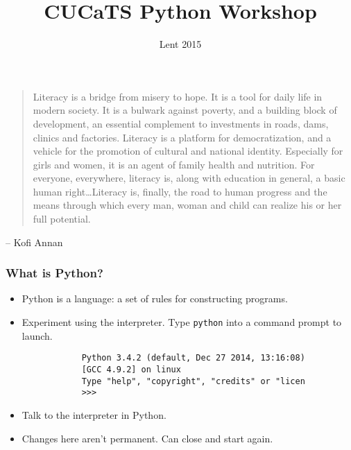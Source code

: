 \documentclass[notes]{beamer}
\title{CUCaTS Python Workshop}
\date{Lent 2015}
\begin{document}
	
	\begin{frame}[fragile]
		\maketitle
	\end{frame}
	
	\begin{frame}[fragile]
		\begin{quotation}
			Literacy is a bridge from misery to hope. It is a tool for daily life in modern society. It is a bulwark against poverty, and a building block of development, an essential complement to investments in roads, dams, clinics and factories. Literacy is a platform for democratization, and a vehicle for the promotion of cultural and national identity. Especially for girls and women, it is an agent of family health and nutrition. For everyone, everywhere, literacy is, along with education in general, a basic human right\dots Literacy is, finally, the road to human progress and the means through which every man, woman and child can realize his or her full potential.
		\end{quotation}
		\hfill  -- Kofi Annan
	\end{frame}
	
	\begin{frame}[fragile]
		\frametitle{What is Python?}
		\begin{itemize}
			\item Python is a language: a set of rules for constructing programs.
			\pause
			\item Experiment using the interpreter. Type \lstinline|python| into a command prompt to launch.
			\begin{lstlisting}
			Python 3.4.2 (default, Dec 27 2014, 13:16:08)
			[GCC 4.9.2] on linux
			Type "help", "copyright", "credits" or "licen
			>>>
			\end{lstlisting}
			\pause
			\item Talk to the interpreter in Python.
			\pause
			\item Changes here aren't permanent. Can close and start again.
				
		\end{itemize}
	\end{frame}
	
\end{document}
